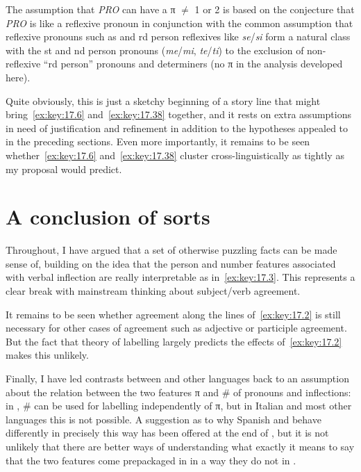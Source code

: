 \documentclass[output=paper]{langsci/langscibook}
\begin{document}
The assumption that \emph{PRO} can have a π ${\neq}$ 1 or 2 is based on
the conjecture that \emph{PRO} is like a reflexive pronoun in conjunction
with the common assumption that reflexive pronouns such as  and
\Third{}rd person reflexives like \emph{se}/\emph{si} form a natural class
with the \First{}st and \Second{}nd person pronouns (\emph{me}/\emph{mi},
\emph{te}/\emph{ti}) to the exclusion of non-reflexive ``\Third{}rd
person'' pronouns and determiners (no π in the analysis developed here).

Quite obviously, this is just a sketchy beginning of a story line that might
bring~\eqref{ex:key:17.6} and~\eqref{ex:key:17.38} together, and it rests on extra
assumptions in need of justification and refinement in addition to the
hypotheses appealed to in the preceding sections. Even more importantly, it
remains to be seen whether~\eqref{ex:key:17.6} and~\eqref{ex:key:17.38} cluster
cross-linguistically as tightly as my proposal would predict.

\section{A conclusion of sorts}\label{sec:key:17.9}

Throughout, I have argued that a set of otherwise puzzling facts can be made
sense of, building on the idea that the person and number features associated with verbal inflection are really
interpretable as in~\eqref{ex:key:17.3}. This represents a clear break with
mainstream thinking about subject/verb agreement.

It remains to be seen whether agreement along the lines of~\eqref{ex:key:17.2}
is still necessary for other cases of agreement such as adjective or participle
agreement. But the fact that  theory of
labelling largely predicts the effects of~\eqref{ex:key:17.2}
makes this unlikely.

Finally, I have led contrasts between  and other languages back to
an assumption about the relation between the two features π and \# of pronouns and inflections: in , \#
can be used for labelling independently of π, but in Italian and
most other languages this is not possible. A suggestion as to why Spanish and
 behave differently in precisely this way has been offered at the
end of , but it is not unlikely that there are better ways
of understanding what exactly it means to say that the two features come
prepackaged in  in a way they do not in .

\printchapterglossary{}

{\sloppy
\printbibliography[heading=subbibliography,notkeyword=this]
}
\end{document}
